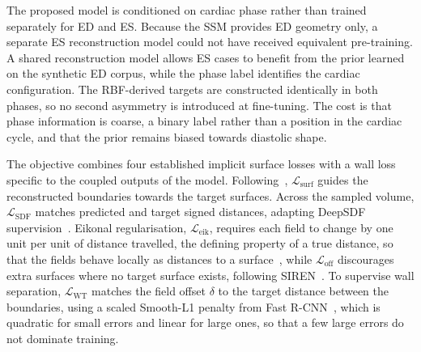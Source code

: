 The proposed model is conditioned on cardiac phase rather
than trained separately for ED and ES. Because the SSM provides ED geometry
only, a separate ES reconstruction model could not have received equivalent
pre-training. A shared reconstruction model allows ES cases to benefit from
the prior learned on the synthetic ED corpus, while the phase label identifies
the cardiac configuration. The RBF-derived targets are constructed identically in both phases, so
no second asymmetry is introduced at fine-tuning. The cost is that phase
information is coarse, a binary label rather than a position in the cardiac
cycle, and that the prior remains biased towards diastolic shape.

The objective combines four established implicit surface losses with a wall
loss specific to the coupled outputs of the model.
Following~\textcite{gropp2020igr}, $\mathcal{L}_{\mathrm{surf}}$ guides the
reconstructed boundaries towards the target surfaces. Across the sampled
volume, $\mathcal{L}_{\mathrm{SDF}}$ matches predicted and target signed
distances, adapting DeepSDF supervision~\parencite{deepsdf2019}.
Eikonal regularisation, $\mathcal{L}_{\mathrm{eik}}$, requires each field to
change by one unit per unit of distance travelled, the defining property of a
true distance, so that the fields behave locally as distances to a
surface~\parencite{gropp2020igr}, while
$\mathcal{L}_{\mathrm{off}}$ discourages extra surfaces where no target
surface exists, following SIREN~\parencite{sitzmann2020siren}. To supervise
wall separation, $\mathcal{L}_{\mathrm{WT}}$ matches the field offset
$\delta$ to the target distance between the boundaries, using a scaled
Smooth-L1 penalty from Fast R-CNN~\parencite{girshick2015fastrcnn}, which is
quadratic for small errors and linear for large ones, so that a few large
errors do not dominate training.

